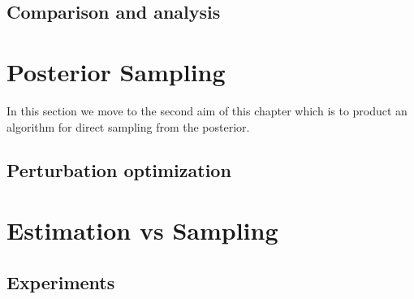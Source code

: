 \subsection{Comparison and analysis}

\label{sec:logvar_experiments}



\section{Posterior Sampling}

\label{sec:sampling}


In this section we move to the second aim of this chapter which is to product an algorithm for direct sampling from the posterior. 

\subsection{Perturbation optimization}



\section{Estimation vs Sampling}

\subsection{Experiments}
